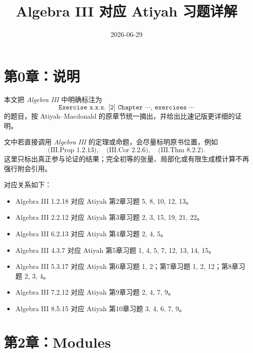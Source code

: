 \documentclass[a4paper]{ctexart}
\title{Algebra III 对应 Atiyah 习题详解}
\author{}
\date{2026-06-29}
\begin{document}
\maketitle
\tableofcontents

\section*{第0章：说明}
{}

本文把 \textit{Algebra III} 中明确标注为
\[
\texttt{Exercise x.x.x. [2] Chapter \(\cdots\), exercises \(\cdots\)}
\]
的题目，按 Atiyah--Macdonald 的原章节统一摘出，并给出比速记版更详细的证明。

文中若直接调用 \textit{Algebra III} 的定理或命题，会尽量标明原书位置，例如
\[
\text{(III.Prop 1.2.13)},\quad \text{(III.Cor 2.2.6)},\quad \text{(III.Thm 8.2.2)}.
\]
这里只标出真正参与论证的结果；完全初等的张量、局部化或有限生成模计算不再强行附会引用。

对应关系如下：
\begin{itemize}
  \item Algebra III 1.2.18 对应 Atiyah 第2章习题 5, 8, 10, 12, 13。
  \item Algebra III 2.2.12 对应 Atiyah 第3章习题 2, 3, 15, 19, 21, 22。
  \item Algebra III 6.2.13 对应 Atiyah 第4章习题 2, 4, 5。
  \item Algebra III 4.3.7 对应 Atiyah 第5章习题 1, 4, 5, 7, 12, 13, 14, 15。
  \item Algebra III 5.3.17 对应 Atiyah 第6章习题 1, 2；第7章习题 1, 2, 12；第8章习题 2, 3, 4。
  \item Algebra III 7.2.12 对应 Atiyah 第9章习题 2, 4, 7, 9。
  \item Algebra III 8.5.15 对应 Atiyah 第10章习题 3, 4, 6, 7, 9。
\end{itemize}

\section{第2章：Modules}
\end{document}
